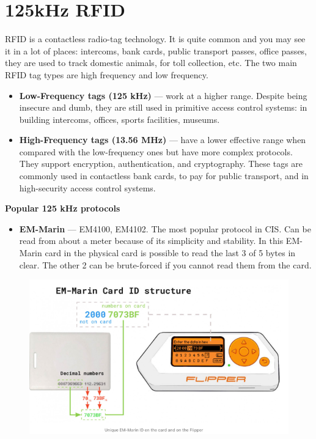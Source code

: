 \documentclass[a4paper,11pt]{report}
\begin{document}
\section{125kHz RFID}
RFID is a contactless radio-tag technology. It is quite common and you may see it in a lot of places: intercoms, bank cards, public transport passes, office passes, they are used to track domestic animals, for toll collection, etc. The two main RFID tag types are high frequency and low frequency.
\begin{itemize}
  \item \textbf{Low-Frequency tags (125 kHz)} — work at a higher range. Despite being insecure and dumb, they are still used in primitive access control systems: in building intercoms, offices, sports facilities, museums.
  \item \textbf{High-Frequency tags (13.56 MHz)} — have a lower effective range when compared with the low-frequency ones but have more complex protocols. They support encryption, authentication, and cryptography. These tags are commonly used in contactless bank cards, to pay for public transport, and in high-security access control systems.
  \end{itemize}
  \textbf{Popular 125 kHz protocols}
  
  \begin{itemize}
    \item \textbf{EM-Marin} — EM4100, EM4102. The most popular protocol in CIS. Can be read from about a meter because of its simplicity and stability. In this EM-Marin card in the physical card is possible to read the last 3 of 5 bytes in clear.
    The other 2 can be brute-forced if you cannot read them from the card.
  \end{itemize}

  \begin{figure}[h]
    \centering
    \hspace{21pt}
    \includegraphics[width=.70\linewidth]{EM_marin.png}
    \label{fig:type.png}
  \end{figure}
  
\end{document}
